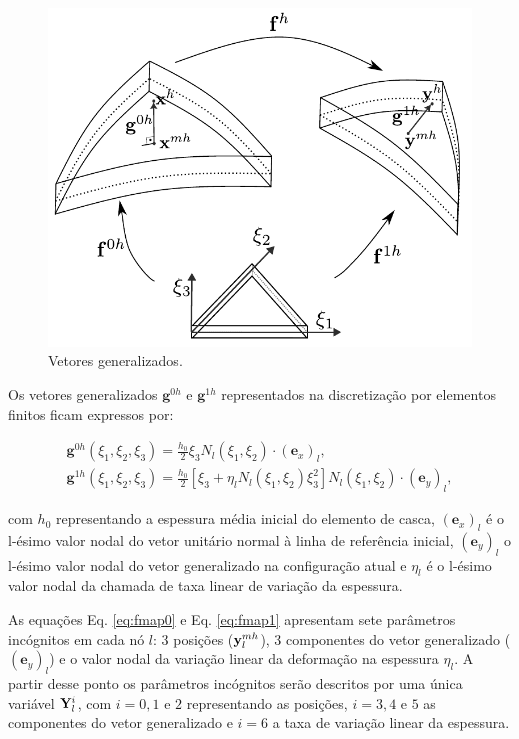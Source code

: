 \documentclass[tese_patricia]{subfiles}
\begin{document}
\begin{figure}[htb!]
	\centering
	\includegraphics[scale=0.8,trim=0cm 0.0cm 0cm 0cm, clip=true]{Imagens/Cap4/casca_vetores_generalizados.pdf}	
	\caption{Vetores generalizados.}
	\label{fig:casca_vetores_generalizados}
\end{figure}

Os vetores generalizados $\mathbf{g}^{0h}$ e $\mathbf{g}^{1h}$ representados na discretização por elementos finitos ficam expressos por:

\begin{align}
\mathbf{g}^{0h} (\xi_{1},\xi_{2}, \xi_{3}) = \frac{h_{0}}{2}\xi_{3} N_{l}\left(\xi_{1},\xi_{2}\right) \cdot  (\mathbf{e}_x)_l, \\
\mathbf{g}^{1h} (\xi_{1},\xi_{2}, \xi_{3}) = \frac{h_{0}}{2}\left[\xi_{3} + \eta_l N_l\left(\xi_{1},\xi_{2}\right)\xi_{3}^2\right]N_{l}\left(\xi_{1},\xi_{2}\right) \cdot (\mathbf{e}_y)_l,
\end{align}

\noindent com $h_{0}$ representando a espessura média inicial do elemento de casca, $(\mathbf{e}_x)_l$ é o l-ésimo valor nodal do vetor unitário normal à linha de referência inicial, $(\mathbf{e}_y)_l$ o l-ésimo valor nodal do vetor generalizado na configuração atual e $\eta_l$ é o l-ésimo valor nodal da chamada de taxa linear de variação da espessura.

As equações Eq. \eqref{eq:fmap0} e Eq. \eqref{eq:fmap1} apresentam sete parâmetros incógnitos em cada nó $l$: 3 posições ($\mathbf{y}_{l}^{mh}$), 3 componentes do vetor generalizado ($(\mathbf{e}_y)_l$) e o valor nodal da variação linear da deformação na espessura $\eta_l$. A partir desse ponto os parâmetros incógnitos serão descritos por uma única variável $ \mathbf{Y}_{l}^{i}$, com $i = 0,1$ e $2$ representando as posições, $i = 3,4$ e $5$ as componentes do vetor generalizado e $i = 6$ a taxa de variação linear da espessura.
\end{document}
